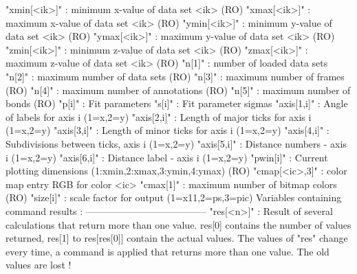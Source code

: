 \begin{MacVerbatim}
"xmin[<ik>]"       : minimum x-value of data set <ik>          (RO)
"xmax[<ik>]"       : maximum x-value of data set <ik>          (RO)
"ymin[<ik>]"       : minimum y-value of data set <ik>          (RO)
"ymax[<ik>]"       : maximum y-value of data set <ik>          (RO)
"zmin[<ik>]"       : minimum z-value of data set <ik>          (RO)
"zmax[<ik>]"       : maximum z-value of data set <ik>          (RO)
"n[1]"             : number of loaded data sets
"n[2]"             : maximum number of data sets               (RO)
"n[3]"             : maximum number of frames                  (RO)
"n[4]"             : maximum number of annotations             (RO)
"n[5]"             : maximum number of bonds                   (RO)
"p[i]"             : Fit parameters
"s[i]"             : Fit parameter sigmas
"axis[1,i]"        : Angle of labels for axis i (1=x,2=y)
"axis[2,i]"        : Length of major ticks for axis i (1=x,2=y)
"axis[3,i]"        : Length of minor ticks for axis i (1=x,2=y)
"axis[4,i]"        : Subdivisions between ticks, axis i (1=x,2=y)
"axis[5,i]"        : Distance numbers - axis i (1=x,2=y)
"axis[6,i]"        : Distance label - axis i (1=x,2=y)
"pwin[i]"          : Current plotting dimensions
                     (1:xmin,2:xmax,3:ymin,4:ymax)             (RO)
"cmap[<ic>,3]"     : color map entry RGB for color <ic>
"cmax[1]"          : maximum number of bitmap colors          (RO)
"size[i]"          : scale factor for output (1=x11,2=ps,3=pic)
Variables containing command results :
--------------------------------------
"res[<n>]"          : Result of several calculations that return more
                      than one value.  res[0] contains the number of
                      values returned, res[1] to res[res[0]] contain the
                      actual values.  The values of "res" change every time,
                      a command is applied that returns more than one
                      value. The old values are lost !
\end{MacVerbatim}
